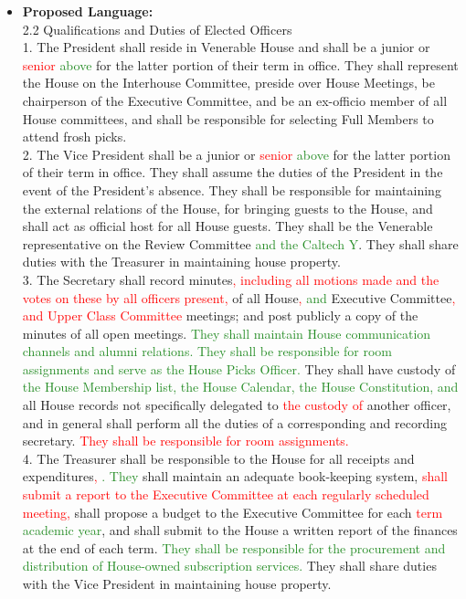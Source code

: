 \documentclass[10pt]{article} %
\newcommand{\add}[1]{\textcolor{ForestGreen}{#1}} %
\newcommand{\del}[1]{\textcolor{red}{#1}} %
\newcommand{\swap}[2]{\del{#1} \add{#2}} %
\begin{document}
\begin{itemize}
    \item \textbf{Proposed Language:} \\
        2.2 Qualifications and Duties of Elected Officers \\
        1. The President shall reside in Venerable House and shall be a junior or \swap{senior}{above} for the latter portion of their term in office. They shall represent the House on the Interhouse Committee, preside over House Meetings, be chairperson of the Executive Committee, and be an ex-officio member of all House committees, and shall be responsible for selecting Full Members to attend frosh picks. \\
        2. The Vice President shall be a junior or \swap{senior}{above} for the latter portion of their term in office. They shall assume the duties of the President in the event of the President's absence. They shall be responsible for maintaining the external relations of the House, for bringing guests to the House, and shall act as official host for all House guests. They shall be the Venerable representative on the Review Committee \add{and the Caltech Y}. They shall share duties with the Treasurer in maintaining house property. \\
        3. The Secretary shall record minutes\del{, including all motions made and the votes on these by all officers present,} of all House\swap{,}{ and} Executive Committee\del{, and Upper Class Committee} meetings; and post publicly a copy of the minutes of all open meetings. \add{They shall maintain House communication channels and alumni relations. They shall be responsible for room assignments and serve as the House Picks Officer.} They shall have custody of \add{the House Membership list, the House Calendar, the House Constitution, and} all House records not specifically delegated to \del{the custody of} another officer, and in general shall perform all the duties of a corresponding and recording secretary. \del{They shall be responsible for room assignments.} \\
        4. The Treasurer shall be responsible to the House for all receipts and expenditures\swap{,}{\!\!. They} shall maintain an adequate book-keeping system, \del{shall submit a report to the Executive Committee at each regularly scheduled meeting,} shall propose a budget to the Executive Committee for each \swap{term}{academic year}, and shall submit to the House a written report of the finances at the end of each term. \add{They shall be responsible for the procurement and distribution of House-owned subscription services.} They shall share duties with the Vice President in maintaining house property. \\

\end{itemize}
\end{document}
